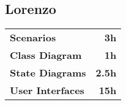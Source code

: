 \subsection*{Lorenzo}
\begin{table}[H]
    \begin{tabular}{lr}
        \toprule
        \textbf{Scenarios}                     & \textbf{3h} \\
        \textbf{Class Diagram}                 & \textbf{1h}   \\
        \textbf{State Diagrams}                & \textbf{2.5h} \\
        \textbf{User Interfaces}               & \textbf{15h}   \\
        \bottomrule
    \end{tabular}
\end{table}
